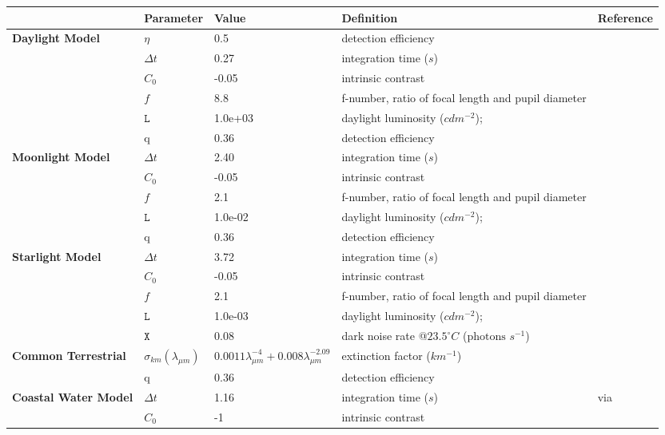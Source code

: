 \begin{tabular}{|L{3.5cm}|L{2.5cm}|L{2.5cm}|L{4.5cm}|L{4.5cm}|}
\hline
\textbf{ }&\textbf{Parameter}&\textbf{Value}&\textbf{Definition}&\textbf{Reference}\\\hline
\textbf{Daylight Model}&$\eta$&0.5&detection efficiency&\cite{Pirh07a}\\\hline
 &$\Delta t$&0.27&integration time ($s$)&\cite{Donn95a}\\\hline
 &$C_{0}$&-0.05&intrinsic contrast&\cite{Blac46a}\\\hline
 &$f$&8.8&f-number, ratio of focal length and pupil diameter&\cite{Mill79a}\\\hline
 &$\mathtt{L}$&1.0e+03&daylight luminosity ($cd m^{-2}$);&\cite{Midd52a}\\\hline
 &q&0.36&detection efficiency&\cite{Nils14a}\\\hline
\textbf{Moonlight Model}&$\Delta t$&2.40&integration time ($s$)&\cite{Donn95a}\\\hline
 &$C_{0}$&-0.05&intrinsic contrast&\cite{Blac46a}\\\hline
 &$f$&2.1&f-number, ratio of focal length and pupil diameter&\cite{Mill79a}\\\hline
 &$\mathtt{L}$&1.0e-02&daylight luminosity ($cd m^{-2}$);&\cite{Midd52a}\\\hline
 &q&0.36&detection efficiency&\cite{Nils14a}\\\hline
\textbf{Starlight Model}&$\Delta t$&3.72&integration time ($s$)&\cite{Donn95a}\\\hline
 &$C_{0}$&-0.05&intrinsic contrast&\cite{Blac46a}\\\hline
 &$f$&2.1&f-number, ratio of focal length and pupil diameter&\cite{Mill79a}\\\hline
 &$\mathtt{L}$&1.0e-03&daylight luminosity ($cd m^{-2}$);&\cite{Midd52a}\\\hline
 &$\mathtt{X}$&0.08&dark noise rate @$23.5^{\circ} C$ ($\text{photons } s^{-1}$)&\cite{Aho93a}\\\hline
\textbf{Common Terrestrial}&$\sigma_{km} (\lambda_{\mu m})$&$0.0011 \lambda_{\mu m}^{-4} + 0.008 \lambda_{\mu m}^{-2.09}$&extinction factor ($km^{-1}$)&\cite{Midd52a}\\\hline
 &q&0.36&detection efficiency&\cite{Nils14a}\\\hline
\textbf{Coastal Water Model}&$\Delta t$&1.16&integration time ($s$)&\cite{Nils14a} via \cite{Donn95a}\\\hline
 &$C_{0}$&-1&intrinsic contrast&\cite{Nils14a}\\\hline

\end{tabular}
